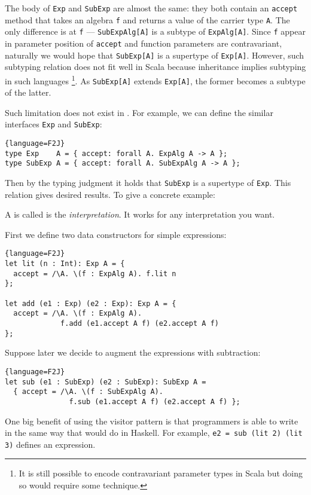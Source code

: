 The body of \lstinline{Exp} and \lstinline{SubExp} are almost the same: they
both contain an \lstinline{accept} method that takes an algebra \lstinline{f}
and returns a value of the carrier type \lstinline{A}. The only difference is at
\lstinline{f} --- \lstinline{SubExpAlg[A]} is a subtype of
\lstinline{ExpAlg[A]}. Since \lstinline{f} appear in parameter position of
\lstinline{accept} and function parameters are contravariant, naturally we would
hope that \lstinline{SubExp[A]} is a supertype of \lstinline{Exp[A]}. However,
such subtyping relation does not fit well in Scala because inheritance implies
subtyping in such languages \footnote{It is still possible to encode
  contravariant parameter types in Scala but doing so would require some
  technique.}. As \lstinline{SubExp[A]} extends \lstinline{Exp[A]}, the former
becomes a subtype of the latter.

Such limitation does not exist in \name. For example, we can define the similar interfaces \lstinline{Exp} and \lstinline{SubExp}:
\begin{lstlisting}{language=F2J}
type Exp    A = { accept: forall A. ExpAlg A -> A };
type SubExp A = { accept: forall A. SubExpAlg A -> A };
\end{lstlisting}
Then by the typing judgment it holds that \lstinline{SubExp} is a supertype of
\lstinline{Exp}. This relation gives desired results. To give a concrete example:

A is called is the \emph{interpretation}. It works for any interpretation you want.

First we define two data constructors for simple expressions:
\begin{lstlisting}{language=F2J}
let lit (n : Int): Exp A = {
  accept = /\A. \(f : ExpAlg A). f.lit n
};

let add (e1 : Exp) (e2 : Exp): Exp A = {
  accept = /\A. \(f : ExpAlg A).
             f.add (e1.accept A f) (e2.accept A f)
};
\end{lstlisting}

Suppose later we decide to augment the expressions with subtraction:
\begin{lstlisting}{language=F2J}
let sub (e1 : SubExp) (e2 : SubExp): SubExp A =
  { accept = /\A. \(f : SubExpAlg A).
               f.sub (e1.accept A f) (e2.accept A f) };
\end{lstlisting}

One big benefit of using the visitor pattern is that programmers is able to
write in the same way that would do in Haskell.
For example, \lstinline{e2 = sub (lit 2) (lit 3)} defines an expression.

